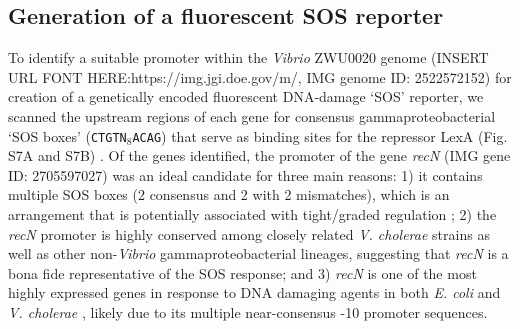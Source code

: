 \subsection*{Generation of a fluorescent SOS reporter}
To identify a suitable promoter within the \textit{Vibrio} ZWU0020 genome (INSERT URL FONT HERE:{https://img.jgi.doe.gov/m/}, IMG genome ID: 2522572152) for creation of a genetically encoded fluorescent DNA-damage `SOS' reporter, we scanned the upstream regions of each gene for consensus gammaproteobacterial `SOS boxes' (\texttt{CTGTN$_8$ACAG}) that serve as binding sites for the repressor LexA (Fig. S7A and S7B) \cite{erill2007aeons}. Of the genes identified, the promoter of the gene \textit{recN} (IMG gene ID: 2705597027) was an ideal candidate for three main reasons: 1) it contains multiple SOS boxes (2 consensus and 2 with 2 mismatches), which is an arrangement that is potentially associated with tight/graded regulation \cite{kreuzer2013dna}; 2) the \textit{recN} promoter is highly conserved among closely related \textit{V. cholerae} strains as well as other non-\textit{Vibrio} gammaproteobacterial lineages, suggesting that \textit{recN} is a bona fide representative of the SOS response; and 3) \textit{recN} is one of the most highly expressed genes in response to DNA damaging agents in both \textit{E. coli} and \textit{V. cholerae} \cite{courcelle2001comparative,Krin2018}, likely due to its multiple near-consensus -10 promoter sequences.

